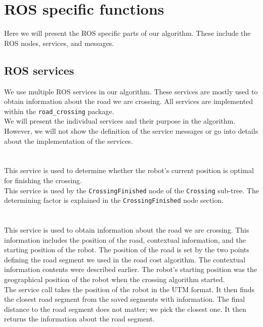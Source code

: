 \section{ROS specific functions}
    Here we will present the ROS specific parts of our algorithm. These include the ROS nodes, services, and messages.

    \subsection{ROS services}
        We use multiple ROS services in our algorithm. These services are mostly used to obtain information about the road we are crossing. All services are implemented within the \texttt{road\_crossing} package.\\
        We will present the individual services and their purpose in the algorithm. However, we will not show the definition of the service messages or go into details about the implementation of the services.\\\\
        \\
            This service is used to determine whether the robot's current position is optimal for finishing the crossing.\\
            This service is used by the \texttt{CrossingFinished} node of the \texttt{Crossing} sub-tree. The determining factor is explained in the \texttt{CrossingFinished} node section.\\\\
        \\
            This service is used to obtain information about the road we are crossing. This information includes the position of the road, contextual information, and the starting position of the robot. The position of the road is set by the two points defining the road segment we used in the road cost algorithm. The contextual information contents were described earlier. The robot's starting position was the geographical position of the robot when the crossing algorithm started.\\
            The service call takes the position of the robot in the UTM format. It then finds the closest road segment from the saved segments with information. The final distance to the road segment does not matter; we pick the closest one. It then returns the information about the road segment.\\\\
        \\
